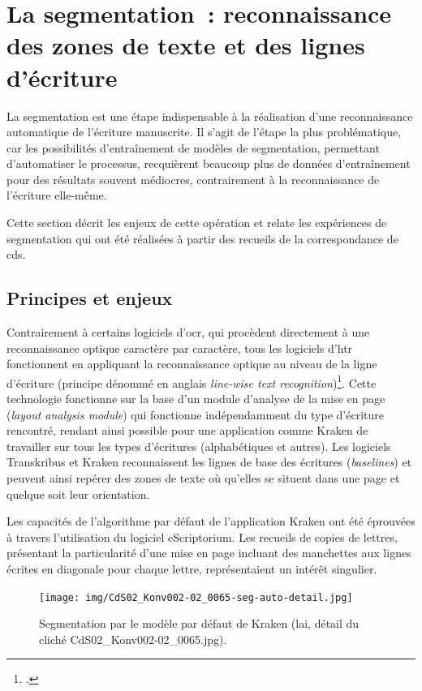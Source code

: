 \documentclass[a4paper,12pt,twoside]{book}
\begin{document}
		\section[La \gls{segmentation}]{La \gls{segmentation}~: reconnaissance des zones de texte et des lignes d'écriture}
			\label{lieu-segmentation}
			
			La \gls{segmentation} est une étape indispensable à la réalisation d'une reconnaissance automatique de l'écriture manuscrite. Il s'agit de l'étape la plus problématique, car les possibilités d'entraînement de modèles de \gls{segmentation}, permettant d'automatiser le processus, recquièrent beaucoup plus de données d'entraînement pour des résultats souvent médiocres, contrairement à la reconnaissance de l'écriture elle-même.
			
			Cette section décrit les enjeux de cette opération et relate les expériences de \gls{segmentation} qui ont été réalisées à partir des recueils de la correspondance de \gls{cds}.
						
			\subsection{Principes et enjeux}
				Contrairement à certains logiciels d'\gls{ocr}, qui procèdent directement à une reconnaissance optique caractère par caractère, tous les logiciels d'\gls{htr} fonctionnent en appliquant la reconnaissance optique au niveau de la ligne d'écriture (principe dénommé en anglais \textit{line-wise text recognition})\footcite{stokesEScriptoriumVREManuscript2021}. Cette technologie fonctionne sur la base d'un module d'analyse de la mise en page (\textit{layout analysis module}) qui fonctionne indépendamment du type d'écriture rencontré, rendant ainsi possible pour une application comme Kraken de travailler sur tous les types d'écritures (alphabétiques et autres). Les logiciels Transkribus et Kraken reconnaissent les lignes de base des écritures (\textit{baselines}) et peuvent ainsi repérer des zones de texte où qu'elles se situent dans une page et quelque soit leur orientation. 
				
				Les capacités de l'algorithme par défaut de l'application Kraken ont été éprouvées à travers l'utilisation du logiciel eScriptorium. Les recueils de copies de lettres, présentant la particularité d'une mise en page incluant des manchettes aux lignes écrites en diagonale pour chaque lettre, représentaient un intérêt singulier.
				
				\begin{figure}[!h]
					\centering
					\texttt{[image: img/CdS02\_Konv002-02\_0065-seg-auto-detail.jpg]}
					\caption{Segmentation par le modèle par défaut de Kraken (\gls{lai}, détail du cliché CdS02\_Konv002-02\_0065.jpg).}
					\label{seg-defaut-65}
				\end{figure}
			
\end{document}
